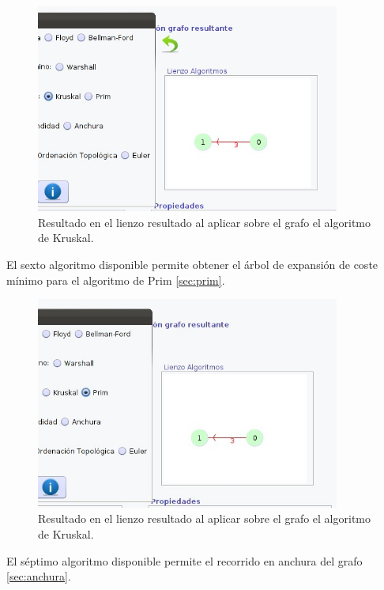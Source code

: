 \begin{figure}[H]
\begin{center}
\includegraphics[width=10cm]{./imagenes_documentacion/imagen_kruskal_y_resultado.jpeg}
\caption{Resultado en el lienzo resultado al aplicar sobre el grafo el algoritmo de Kruskal.}
\end{center}
\end{figure}
\newpage
El sexto algoritmo disponible permite obtener el árbol de expansión de coste mínimo para el algoritmo de Prim \ref{sec:prim}.

\begin{figure}[H]
\begin{center}
\includegraphics[width=10cm]{./imagenes_documentacion/imagen_prim_y_resultado.jpeg}
\caption{Resultado en el lienzo resultado al aplicar sobre el grafo el algoritmo de Kruskal.}
\end{center}
\end{figure}

El séptimo algoritmo disponible permite el recorrido en anchura del grafo \ref{sec:anchura}.

